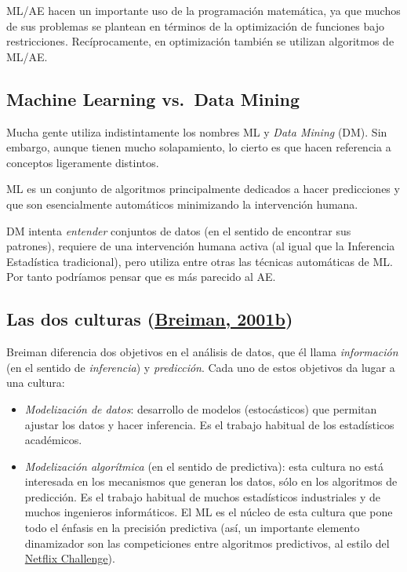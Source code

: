 \documentclass[
  spanish,
]{book}
\theoremstyle{break}
\theoremstyle{definition}
\theoremstyle{definition}
\theoremstyle{definition}
\theoremstyle{definition}
\theoremstyle{remark}
\begin{document}
ML/AE hacen un importante uso de la programación matemática, ya que muchos de sus problemas se plantean en términos de la optimización de funciones bajo restricciones.
Recíprocamente, en optimización también se utilizan algoritmos de ML/AE.

\hypertarget{machine-learning-vs.-data-mining}{%
\subsection{Machine Learning vs.~Data Mining}\label{machine-learning-vs.-data-mining}}

Mucha gente utiliza indistintamente los nombres ML y \emph{Data Mining} (DM).
Sin embargo, aunque tienen mucho solapamiento, lo cierto es que hacen referencia a conceptos ligeramente distintos.

ML es un conjunto de algoritmos principalmente dedicados a hacer predicciones y que son esencialmente automáticos minimizando la intervención humana.

DM intenta \emph{entender} conjuntos de datos (en el sentido de encontrar sus patrones), requiere de una intervención humana activa (al igual que la Inferencia Estadística tradicional), pero utiliza entre otras las técnicas automáticas de ML. Por tanto podríamos pensar que es más parecido al AE.

\hypertarget{las-dos-culturas-breiman2001statistical}{%
\subsection{\texorpdfstring{Las dos culturas (\protect\hyperlink{ref-breiman2001statistical}{Breiman, 2001b})}{Las dos culturas (Breiman, 2001b)}}\label{las-dos-culturas-breiman2001statistical}}

Breiman diferencia dos objetivos en el análisis de datos, que él llama \emph{información} (en el sentido de \emph{inferencia}) y \emph{predicción}.
Cada uno de estos objetivos da lugar a una cultura:

\begin{itemize}
\item
  \emph{Modelización de datos}: desarrollo de modelos (estocásticos) que permitan ajustar los datos y hacer inferencia. Es el trabajo habitual de los estadísticos académicos.
\item
  \emph{Modelización algorítmica} (en el sentido de predictiva): esta cultura no está interesada en los mecanismos que generan los datos, sólo en los algoritmos de predicción. Es el trabajo habitual de muchos estadísticos industriales y de muchos ingenieros informáticos. El ML es el núcleo de esta cultura que pone todo el énfasis en la precisión predictiva (así, un importante elemento dinamizador
  son las competiciones entre algoritmos predictivos, al estilo del \href{https://en.wikipedia.org/wiki/Netflix_Prize}{Netflix Challenge}).
\end{itemize}
\end{document}
